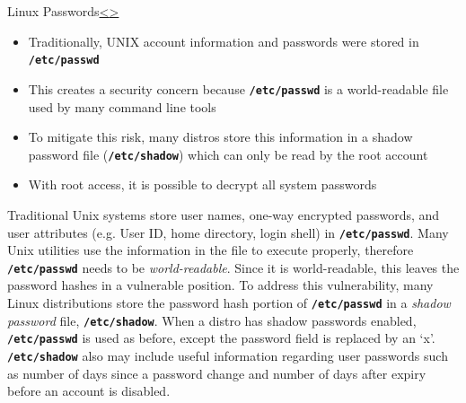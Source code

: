 \documentclass[12pt]{extarticle}
\newcommand{\code}[1]{\texttt{\bfseries#1}}
\newenvironment{instructionblock}{\Large\bgroup}{\egroup}
\begin{document}
	
	\pagebreak
	\begin{slide}{Linux Passwords}{\hyperref[slide 6]{\textless}\hyperref[slide 8]{\textgreater}}
		\begin{instructionblock}
			\begin{itemize}
				\item Traditionally, UNIX account information and passwords were stored in \code{/etc/passwd}
				\item This creates a security concern because \code{/etc/passwd} is a world-readable file used by many command line tools
				\item To mitigate this risk, many distros store this information in a shadow password file (\code{/etc/shadow}) which can only be read by the root account
				\item With root access, it is possible to decrypt all system passwords
			\end{itemize}
		\end{instructionblock}
	\end{slide}
	\vfill
	
	Traditional Unix systems store user names, one-way encrypted passwords, and user attributes (e.g. User ID, home directory, login shell) in \code{/etc/passwd}. Many Unix utilities use the information in the file to execute properly, therefore \code{/etc/passwd} needs to be \textit{world-readable}. Since it is world-readable, this leaves the password hashes in a vulnerable position. To address this vulnerability, many Linux distributions store the password hash portion of \code{/etc/passwd} in a \textit{shadow password} file, \code{/etc/shadow}.
	When a distro has shadow passwords enabled, \code{/etc/passwd} is used as before, except the password field is replaced by an `x'. \code{/etc/shadow} also may include useful information regarding user passwords such as number of days since a password change and number of days after expiry before an account is disabled. \cite{frampton}
	
\end{document}
